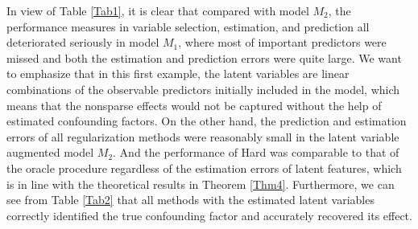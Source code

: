 \documentclass{statsoc}
\begin{document}
In view of Table \ref{Tab1}, it is clear that compared with model $M_2$, the performance measures in variable selection, estimation, and prediction all deteriorated seriously in model $M_1$, where most of important predictors were missed and both the estimation and prediction errors were quite large. We want to emphasize that in this first example, the latent variables are linear combinations of the observable predictors initially included in the model, which means that the nonsparse effects would not be captured without the help of estimated confounding factors. On the other hand, the prediction and estimation errors of all regularization methods were reasonably small in the latent variable augmented model $M_2$. And the performance of Hard was comparable to that of the oracle procedure regardless of the estimation errors of latent features, which is in line with the theoretical results in Theorem \ref{Thm4}. Furthermore, we can see from Table \ref{Tab2} that all methods with the estimated latent variables correctly identified the true confounding factor and accurately recovered its effect.


\begin{table}
\caption{\label{Tab2} Means and standard errors (in parentheses) of different performance measures for regression coefficients of confounding factors by all methods over 200 simulations in Section \ref{Sec6.1.1} (The notation $0.00$ denotes a number less than $0.005$.)}
\centering
\end{table}
\end{document}
